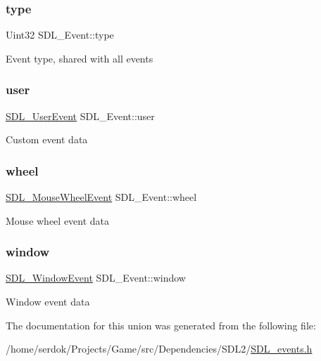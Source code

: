 \subsubsection{\texorpdfstring{type}{type}}
{\footnotesize\ttfamily Uint32 S\+D\+L\+\_\+\+Event\+::type}

Event type, shared with all events \mbox{\label{unionSDL__Event_ab7c394e3ce7bf1e4f8d68bc0e9f1b042}} 
\subsubsection{\texorpdfstring{user}{user}}
{\footnotesize\ttfamily \hyperlink{structSDL__UserEvent}{S\+D\+L\+\_\+\+User\+Event} S\+D\+L\+\_\+\+Event\+::user}

Custom event data \mbox{\label{unionSDL__Event_a267d3f550715519ec90a81ccd0e6cbda}} 
\subsubsection{\texorpdfstring{wheel}{wheel}}
{\footnotesize\ttfamily \hyperlink{structSDL__MouseWheelEvent}{S\+D\+L\+\_\+\+Mouse\+Wheel\+Event} S\+D\+L\+\_\+\+Event\+::wheel}

Mouse wheel event data \mbox{\label{unionSDL__Event_a826936b3275406d857bc6654669fae71}} 
\subsubsection{\texorpdfstring{window}{window}}
{\footnotesize\ttfamily \hyperlink{structSDL__WindowEvent}{S\+D\+L\+\_\+\+Window\+Event} S\+D\+L\+\_\+\+Event\+::window}

Window event data 

The documentation for this union was generated from the following file\+:\begin{DoxyCompactItemize}
\item 
/home/serdok/\+Projects/\+Game/src/\+Dependencies/\+S\+D\+L2/\hyperlink{SDL__events_8h}{S\+D\+L\+\_\+events.\+h}\end{DoxyCompactItemize}
